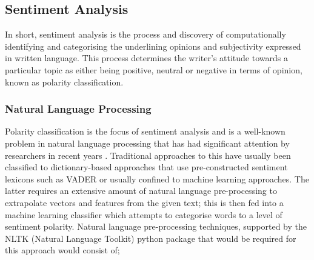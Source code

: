 \documentclass[oneside, 12pt]{article}
\begin{document}
		
		\subsection{Sentiment Analysis}\label{sentiment}
		In short, sentiment analysis is the process and discovery of computationally identifying and categorising the underlining opinions and subjectivity expressed in written language. This process determines the writer's attitude towards a particular topic as either being positive, neutral or negative in terms of opinion, known as polarity classification. 		
			
			\subsubsection{Natural Language Processing}\label{algorithms}
			Polarity classification is the focus of sentiment analysis and is a well-known problem in natural language processing that has had significant attention by researchers in recent years \cite{SaTdpsmm}\cite{BTCFTsent}\cite{MLBTCpred}\cite{PolClassPatients}. Traditional approaches to this have usually been classified to dictionary-based approaches that use pre-constructed sentiment lexicons such as VADER or usually confined to machine learning approaches. The latter requires an extensive amount of natural language pre-processing to extrapolate vectors and features from the given text; this is then fed into a machine learning classifier which attempts to categorise words to a level of sentiment polarity. Natural language pre-processing techniques, supported by the NLTK (Natural Language Toolkit) python package that would be required for this approach would consist of;
			
\end{document}
